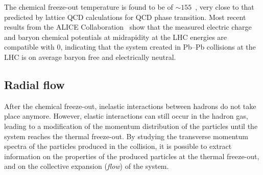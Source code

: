The chemical freeze-out temperature is found to be of $\sim 155$~\mev, very close to that predicted by lattice QCD calculations for QCD phase transition. Most recent results from the ALICE Collaboration~\cite{ALICE:2023ulv} show that the measured electric charge and baryon chemical potentials at midrapidity at the LHC energies are compatible with 0, indicating that the system created in Pb--Pb collisions at the LHC is on average baryon free and electrically neutral.

\subsection{Radial flow}
After the chemical freeze-out, inelastic interactions between hadrons do not take place anymore. However, elastic interactions can still occur in the hadron gas, leading to a modification of the momentum distribution of the particles until the system reaches the thermal freeze-out. By studying the transverse momentum spectra of the particles produced in the collision, it is possible to extract information on the properties of the produced particles at the thermal freeze-out, and on the collective expansion (\emph{flow}) of the system.

